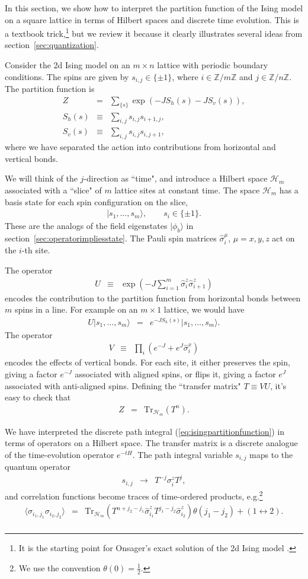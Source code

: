 \documentclass{ws-rv9x6}
\newcommand\be{\begin{eqnarray}}
\newcommand\ee{\end{eqnarray}}
\newcommand\p[1]{\left(#1\right)}
\newcommand\<\langle
\renewcommand\>\rangle
\newcommand\Z{\mathbb{Z}}
\newcommand\nn{\nonumber}
\renewcommand\.{\cdot}
\newcommand\x\times
\newcommand\s\sigma
\newcommand\cH{\mathcal{H}}
\newcommand\Tr{\mathrm{Tr}}
\renewcommand\th{\theta}
\begin{document}
\begin{appendix}
\label{app:latticequantization}

In this section, we show how to interpret the partition function of the Ising model on a square lattice in terms of Hilbert spaces and discrete time evolution.  This is a textbook trick,\footnote{It is the starting point for Onsager's exact solution of the 2d Ising model \cite{PhysRev.65.117}.} but we review it because it clearly illustrates several ideas from section~\ref{sec:quantization}.

Consider the 2d Ising model on an $m\x n$ lattice with periodic boundary conditions.  The spins are given by $s_{i,j}\in \{\pm 1\}$, where $i\in \Z/m\Z$ and $j\in \Z/n\Z$.  The partition function is
\be
\label{eq:isingpartitionfunction}
Z &=& \sum_{\{s\}} \exp\p{-JS_h(s) -J S_v(s)},\nn\\
S_h(s) &\equiv& \sum_{i,j} s_{i,j}s_{i+1,j},\nn\\
S_v(s) &\equiv& \sum_{i,j} s_{i,j} s_{i,j+1},
\ee
where we have separated the action into contributions from horizontal and vertical bonds.

We will think of the $j$-direction as ``time", and introduce a Hilbert space $\cH_m$ associated with a ``slice" of $m$ lattice sites at constant time.  The space $\cH_m$ has a basis state for each spin configuration on the slice,
\be
|s_1,\dots,s_m\>,\qquad s_i\in\{\pm 1\}.
\ee
These are the analogs of the field eigenstates $|\phi_b\>$ in section~\ref{sec:operatorimpliesstate}.
The Pauli spin matrices $\widehat\sigma_i^{\mu}$, $\mu=x,y,z$ act on the $i$-th site.

The operator
\be
 U &\equiv & \exp\p{-J\sum_{i=1}^m \widehat\s^z_i \widehat\s^z_{i+1}}
\ee
encodes the contribution to the partition function from horizontal bonds between $m$ spins in a line. For example on an $m\x 1$ lattice, we would have
\be
 U |s_1,\dots,s_m\> &=& e^{-JS_h(s)}|s_1,\dots,s_m\>.
\ee
The operator
\be
 V &\equiv& \prod_i(e^{-J} + e^{J}\widehat\s_i^x)
\ee
encodes the effects of vertical bonds. For each site, it either preserves the spin, giving a factor $e^{-J}$ associated with aligned spins, or flips it, giving a factor $e^{J}$ associated with anti-aligned spins.  Defining the ``transfer matrix" $ T\equiv VU$, it's easy to check that
\be
Z &=& \Tr_{\cH_m}( T^n).
\ee

We have interpreted the discrete path integral (\ref{eq:isingpartitionfunction}) in terms of operators on a Hilbert space.  The transfer matrix is a discrete analogue of the time-evolution operator $e^{-tH}$.  The path integral variable $s_{i,j}$ maps to the quantum operator
\be 
\label{eq:quantizationmapone}
s_{i,j} &\to& T^{-j} \s_i^z  T^j,
\ee
and correlation functions become traces of time-ordered products, e.g.\footnote{We use the convention $\th(0)=\frac 1 2$.}
\be
\<\s_{i_1,j_1}\s_{i_2,j_2}\> &=& \Tr_{\cH_m}(T^{n+j_2-j_1} \widehat \s_{i_1}^z T^{j_1-j_2} \widehat \s_{i_2}^z)\theta(j_1 - j_2) + (1\leftrightarrow 2).\nn\\
\ee


\end{appendix}
\end{document}
